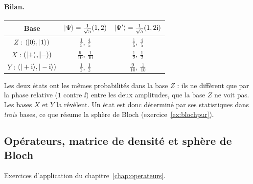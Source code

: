 \begin{correction}
\paragraph{Bilan.}
\begin{center}
\renewcommand{\arraystretch}{1.35}
\begin{tabular}{@{}c c c@{}}
\toprule
Base & $|\Psi\rangle=\frac{1}{\sqrt5}(1,2)$ & $|\Psi'\rangle=\frac{1}{\sqrt5}(1,2\mathrm{i})$ \\
\midrule
$Z$ : $(|0\rangle,|1\rangle)$ & $\frac15,\ \frac45$ & $\frac15,\ \frac45$ \\
$X$ : $(|+\rangle,|-\rangle)$ & $\frac9{10},\ \frac1{10}$ & $\frac12,\ \frac12$ \\
$Y$ : $(|+\mathrm{i}\rangle,|-\mathrm{i}\rangle)$ & $\frac12,\ \frac12$ & $\frac9{10},\ \frac1{10}$ \\
\bottomrule
\end{tabular}
\end{center}
Les deux états ont les mêmes probabilités dans la base $Z$ : ils ne diffèrent que par la phase
relative ($1$ contre $\ii$) entre les deux amplitudes, que la base $Z$ ne voit pas. Les bases $X$ et
$Y$ la révèlent. Un état est donc déterminé par ses statistiques dans \emph{trois} bases, ce que
résume la sphère de Bloch (exercice~\ref{ex:blochpur}).
\end{correction}

\subsection{Opérateurs, matrice de densité et sphère de Bloch}\label{sec:ex-operateurs}

Exercices d'application du chapitre~\ref{chap:operateurs}.

